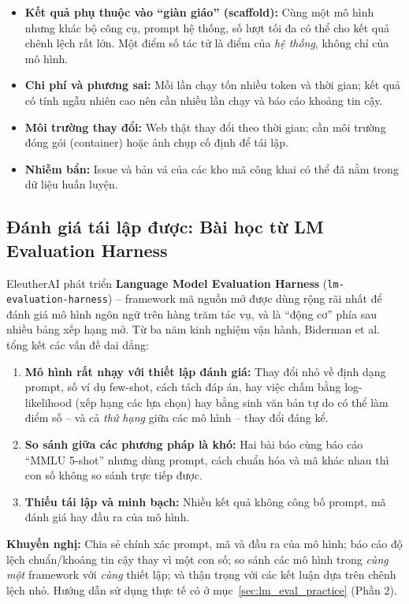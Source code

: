 \begin{tcolorbox}[title={Những khó khăn đặc thù khi đánh giá tác tử}, colback=red!5!white, colframe=red!75!black, fonttitle=\bfseries]
\begin{itemize}
	\item \textbf{Kết quả phụ thuộc vào “giàn giáo” (scaffold):} Cùng một mô hình nhưng khác bộ công cụ, prompt hệ thống, số lượt tối đa có thể cho kết quả chênh lệch rất lớn. Một điểm số tác tử là điểm của \emph{hệ thống}, không chỉ của mô hình.
	\item \textbf{Chi phí và phương sai:} Mỗi lần chạy tốn nhiều token và thời gian; kết quả có tính ngẫu nhiên cao nên cần nhiều lần chạy và báo cáo khoảng tin cậy.
	\item \textbf{Môi trường thay đổi:} Web thật thay đổi theo thời gian; cần môi trường đóng gói (container) hoặc ảnh chụp cố định để tái lập.
	\item \textbf{Nhiễm bẩn:} Issue và bản vá của các kho mã công khai có thể đã nằm trong dữ liệu huấn luyện.
\end{itemize}
\end{tcolorbox}

\subsection{Đánh giá tái lập được: Bài học từ LM Evaluation Harness}
\label{ssec:lm_eval_harness}
EleutherAI phát triển \textbf{Language Model Evaluation Harness} (\texttt{lm-evaluation-harness}) -- framework mã nguồn mở được dùng rộng rãi nhất để đánh giá mô hình ngôn ngữ trên hàng trăm tác vụ, và là “động cơ” phía sau nhiều bảng xếp hạng mở. Từ ba năm kinh nghiệm vận hành, Biderman et al. \cite{biderman2024lessons} tổng kết các vấn đề dai dẳng:
\begin{enumerate}
	\item \textbf{Mô hình rất nhạy với thiết lập đánh giá:} Thay đổi nhỏ về định dạng prompt, số ví dụ few-shot, cách tách đáp án, hay việc chấm bằng log-likelihood (xếp hạng các lựa chọn) hay bằng sinh văn bản tự do có thể làm điểm số -- và cả \emph{thứ hạng} giữa các mô hình -- thay đổi đáng kể.
	\item \textbf{So sánh giữa các phương pháp là khó:} Hai bài báo cùng báo cáo “MMLU 5-shot” nhưng dùng prompt, cách chuẩn hóa và mã khác nhau thì con số không so sánh trực tiếp được.
	\item \textbf{Thiếu tái lập và minh bạch:} Nhiều kết quả không công bố prompt, mã đánh giá hay đầu ra của mô hình.
\end{enumerate}
\textbf{Khuyến nghị:} Chia sẻ chính xác prompt, mã và đầu ra của mô hình; báo cáo độ lệch chuẩn/khoảng tin cậy thay vì một con số; so sánh các mô hình trong \emph{cùng một} framework với \emph{cùng} thiết lập; và thận trọng với các kết luận dựa trên chênh lệch nhỏ. Hướng dẫn sử dụng thực tế có ở mục~\ref{sec:lm_eval_practice} (Phần 2).

